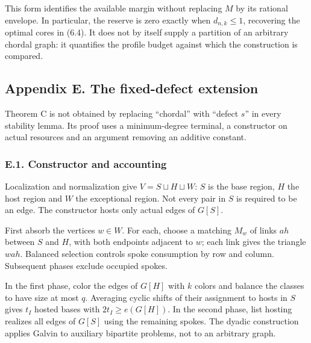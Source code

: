 \documentclass[english,11pt,a4paper]{article}
\begin{document}
This form identifies the available margin without replacing \(M\) by its rational envelope. In particular, the reserve is zero exactly when \(d_{n,k}\le1\), recovering the optimal cores in (6.4). It does not by itself supply a partition of an arbitrary chordal graph: it quantifies the profile budget against which the construction is compared.

\subsection{Appendix E. The fixed-defect extension}\label{appendix-e.-the-fixed-defect-extension}

Theorem C is not obtained by replacing ``chordal'' with ``defect \(s\)'' in every stability lemma. Its proof uses a minimum-degree terminal, a constructor on actual resources and an argument removing an additive constant.

\subsubsection{E.1. Constructor and accounting}\label{e.1.-constructor-and-accounting}

Localization and normalization give \(V=S\sqcup H\sqcup W\): \(S\) is the base region, \(H\) the host region and \(W\) the exceptional region. Not every pair in \(S\) is required to be an edge. The constructor hosts only actual edges of \(G[S]\).

First absorb the vertices \(w\in W\). For each, choose a matching \(M_w\) of links \(ah\) between \(S\) and \(H\), with both endpoints adjacent to \(w\); each link gives the triangle \(wah\). Balanced selection controls spoke consumption by row and column. Subsequent phases exclude occupied spokes.

In the first phase, color the edges of \(G[H]\) with \(k\) colors and balance the classes to have size at most \(q\). Averaging cyclic shifts of their assignment to hosts in \(S\) gives \(t_I\) hosted bases with \(2t_I\ge e(G[H])\). In the second phase, list hosting realizes all edges of \(G[S]\) using the remaining spokes. The dyadic construction applies Galvin to auxiliary bipartite problems, not to an arbitrary graph.
\end{document}
